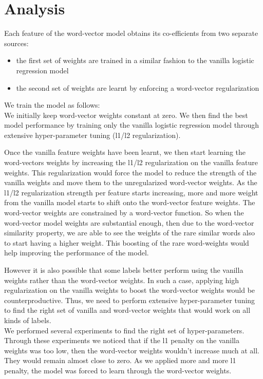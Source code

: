 \newpage
\section{Analysis}

Each feature of the word-vector model obtains its co-efficients from two separate sources:
\begin{itemize}
\item the first set of weights are trained in a similar fashion to the vanilla logistic regression model
\item the second set of weights are learnt by enforcing a word-vector regularization
\end{itemize}

We train the model as follows:\\

We initially keep word-vector weights constant at zero.
We then find the best model performance by training only the vanilla logistic regression model through extensive hyper-parameter tuning (l1/l2 regularization).

Once the vanilla feature weights have been learnt, we then start learning the word-vectors weights by increasing the l1/l2 regularization on the vanilla feature weights. This regularization would force the model to reduce the strength of the vanilla weights and move them to the unregularized word-vector weights. As the l1/l2 regularization strength per feature starts increasing, more and more weight from the vanilla model starts to shift onto the word-vector feature weights. 
The word-vector weights are constrained by a word-vector function. So when the word-vector model weights are substantial enough, then due to the word-vector similarity property, we are able to see the weights of the rare similar words also to start having a higher weight. This boosting of the rare word-weights would help improving the performance of the model.

However it is also possible that some labels better perform using the vanilla weights rather than the word-vector weights. In such a case, applying high regularization on the vanilla weights to boost the word-vector weights would be counterproductive. Thus, we need to perform extensive hyper-parameter tuning to find the right set of vanilla and word-vector weights that would work on all kinds of labels.\\

We performed several experiments to find the right set of hyper-parameters. Through these experiments we noticed that if the l1 penalty on the vanilla weights was too low, then the word-vector weights wouldn't increase much at all. They would remain almost close to zero. As we applied more and more l1 penalty, the model was forced to learn through the word-vector weights. 

